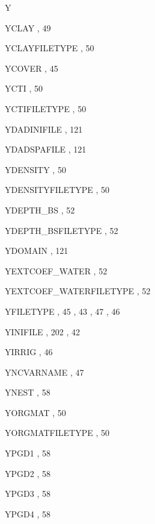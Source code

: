 \begin{theindex}
  \indexspace
Y
  \item YCLAY
    \subitem {},  49
  \item YCLAYFILETYPE
    \subitem {},  50
  \item YCOVER
    \subitem {},  45
  \item YCTI
    \subitem {},  50
  \item YCTIFILETYPE
    \subitem {},  50
  \item YDADINIFILE
    \subitem {},  121
  \item YDADSPAFILE
    \subitem {},  121
  \item YDENSITY
    \subitem {},  50
  \item YDENSITYFILETYPE
    \subitem {},  50
  \item YDEPTH\_BS
    \subitem {},  52
  \item YDEPTH\_BSFILETYPE
    \subitem {},  52
  \item YDOMAIN
    \subitem {},  121
  \item YEXTCOEF\_WATER
    \subitem {},  52
  \item YEXTCOEF\_WATERFILETYPE
    \subitem {},  52
  \item YFILETYPE
    \subitem {},  45
    \subitem {},  43
    \subitem {},  47
    \subitem {},  46
  \item YINIFILE
    \subitem {},  202
    \subitem {},  42
  \item YIRRIG
    \subitem {},  46
  \item YNCVARNAME
    \subitem {},  47
  \item YNEST
    \subitem {},  58
  \item YORGMAT
    \subitem {},  50
  \item YORGMATFILETYPE
    \subitem {},  50
  \item YPGD1
    \subitem {},  58
  \item YPGD2
    \subitem {},  58
  \item YPGD3
    \subitem {},  58
  \item YPGD4
    \subitem {},  58

\end{theindex}
